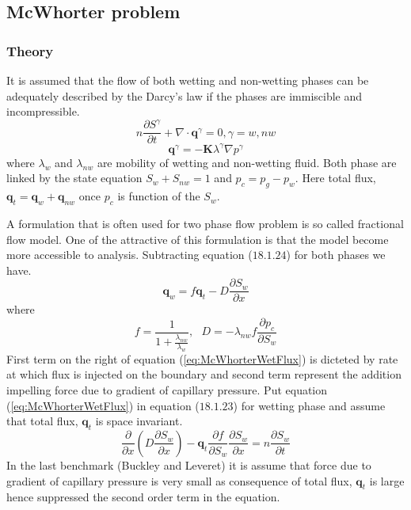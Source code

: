 \subsection{\upshape\textbf{McWhorter problem}\label{MWPIsoTwoPhaseFlow}}
\subsubsection*{\upshape\textbf{Theory}}
It is assumed that the flow of both wetting and non-wetting phases can be adequately described by the Darcy's law if the phases are immiscible and incompressible.
\begin{equation}
n\frac{\partial S^{\gamma}}{\partial t} + \nabla \cdot \mathbf{q}^{\gamma} = 0, \gamma=w, nw
\label{eq:mcwtMassEq}
\end{equation}
\begin{equation}
\mathbf{q}^{\gamma}=-{\mathbf K} \lambda^{\gamma} \nabla p^{\gamma}
\label{eq:mcwtFluxEq}
\end{equation}
where $\lambda_w$ and  $\lambda_{nw}$ are mobility of wetting and non-wetting fluid. Both phase are linked by the state equation $S_w+S_{nw}=1$ and $p_c=p_g-p_w$. Here total flux, $\mathbf {q}_t=\mathbf {q}_w + \mathbf {q}_{nw}$ once $p_c$ is function of the $S_w$.


A formulation that is often used for two phase flow problem is so called fractional flow model. One of the attractive of this formulation is that the model become more accessible to analysis. Subtracting equation ($18.1.24$) for both phases we have.
\begin{equation}
\mathbf {q}_w=f \mathbf {q}_t- D \frac{\partial S_w}{\partial x}
\label{eq:McWhorterWetFlux}
\end{equation}
where 
\begin{equation*}
f=\frac{1}{1 + \frac{\lambda_{nw}}{\lambda_w}},~~~D=-\lambda_{nw} f \frac{\partial p_c}{\partial S_w}
\end{equation*}
First term on the right of equation (\ref{eq:McWhorterWetFlux}) is dicteted by rate at which flux is injected on the boundary and second term represent the addition impelling force due to gradient of capillary pressure. Put equation (\ref{eq:McWhorterWetFlux}) in equation ($18.1.23$) for wetting phase and assume that total flux, $\mathbf q_t$ is space invariant.
\begin{equation}
\frac{\partial }{\partial x}\left( D\frac{\partial S_w}{\partial x}\right) - \mathbf q_t \frac{\partial f}{\partial S_w}\frac{\partial S_w}{\partial x}=n \frac{\partial S_w}{\partial t}
\label{eq:McWhorterAnal}
\end{equation}
In the last benchmark (Buckley and Leveret) it is assume that force due to gradient of capillary pressure is very small as consequence of total flux, $\mathbf q_t$ is large hence suppressed the second order term in the equation.


